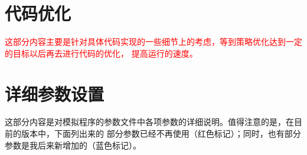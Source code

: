 \documentclass[a4paper,11pt]{ctexart}
\newcommand{\RT}[1]{\textcolor{red}{#1}}
\begin{document}
\newpage
\section{代码优化}
\RT{这部分内容主要是针对具体代码实现的一些细节上的考虑，等到策略优化达到一定的目标以后再去进行代码的优化，
提高运行的速度。}

\newpage
\appendix
\section{详细参数设置}
这部分内容是对模拟程序的参数文件中各项参数的详细说明。值得注意的是，在目前的版本中，下面列出来的
部分参数已经不再使用（红色标记）；同时，也有部分参数是我后来新增加的（蓝色标记）。
\end{document}
